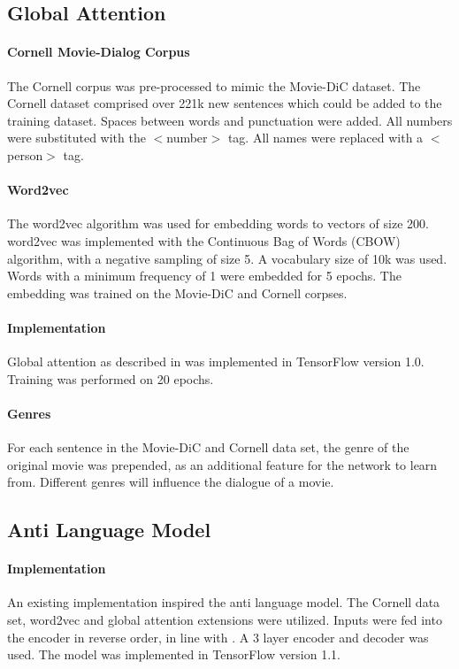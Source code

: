 \documentclass[%
 reprint,
 amsmath,amssymb,
 aps,
]{revtex4-1}
\begin{document}
\subsection{\label{sec:level2}Global Attention}

\paragraph{Cornell Movie-Dialog Corpus}
The Cornell corpus was pre-processed to mimic the Movie-DiC dataset. The Cornell dataset comprised over 221k new sentences which could be added to the training dataset. Spaces between words and punctuation were added. All numbers were substituted with the $<$number$>$ tag. All names were replaced with a $<$person$>$ tag.

\paragraph{Word2vec}
The word2vec algorithm \cite{word2vec} was used for embedding words to vectors of size 200. word2vec was implemented with the Continuous Bag of Words (CBOW) algorithm, with a negative sampling of size 5. A vocabulary size of 10k was used. Words with a minimum frequency of 1 were embedded for 5 epochs. The embedding was trained on the Movie-DiC and Cornell corpses.

\paragraph{Implementation}
Global attention as described in \cite{globalattention} was implemented in TensorFlow version 1.0. Training was performed on 20 epochs.

\paragraph{Genres}
For each sentence in the Movie-DiC and Cornell data set, the genre of the original movie was prepended, as an additional feature for the network to learn from. Different genres will influence the dialogue of a movie.

\subsection{\label{sec:level2}Anti Language Model} \label{antilm}

\paragraph{Implementation} An existing implementation \cite{antilmgithub} inspired the anti language model. The Cornell data set, word2vec and global attention extensions were utilized. Inputs were fed into the encoder in reverse order, in line with \cite{antilmgithub}. A 3 layer encoder and decoder was used. The model was implemented in TensorFlow version 1.1.
\end{document}
